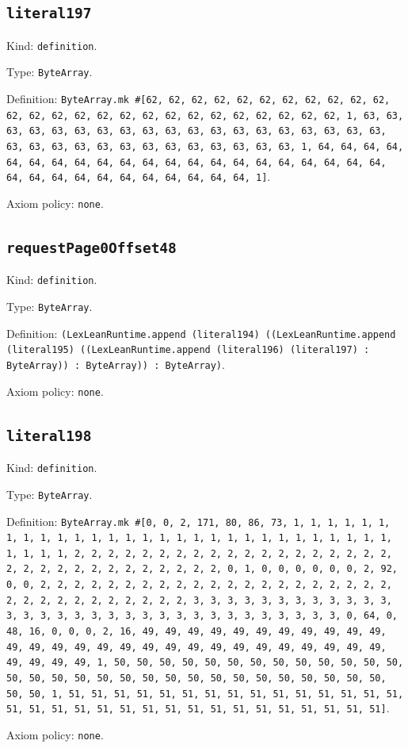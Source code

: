 \documentclass[11pt]{article}
\begin{document}
\subsection*{\texttt{literal197}}
\noindent Kind: \texttt{definition}.\par
\noindent Type: \texttt{ByteArray}.\par
\noindent Definition: \texttt{ByteArray.mk \#[62, 62, 62, 62, 62, 62, 62, 62, 62, 62, 62, 62, 62, 62, 62, 62, 62, 62, 62, 62, 62, 62, 62, 62, 62, 62, 1, 63, 63, 63, 63, 63, 63, 63, 63, 63, 63, 63, 63, 63, 63, 63, 63, 63, 63, 63, 63, 63, 63, 63, 63, 63, 63, 63, 63, 63, 63, 63, 63, 1, 64, 64, 64, 64, 64, 64, 64, 64, 64, 64, 64, 64, 64, 64, 64, 64, 64, 64, 64, 64, 64, 64, 64, 64, 64, 64, 64, 64, 64, 64, 64, 64, 1]}.\par
\noindent Axiom policy: \texttt{none}.\par
\subsection*{\texttt{requestPage0Offset48}}
\noindent Kind: \texttt{definition}.\par
\noindent Type: \texttt{ByteArray}.\par
\noindent Definition: \texttt{(LexLeanRuntime.append (literal194) ((LexLeanRuntime.append (literal195) ((LexLeanRuntime.append (literal196) (literal197) : ByteArray)) : ByteArray)) : ByteArray)}.\par
\noindent Axiom policy: \texttt{none}.\par
\subsection*{\texttt{literal198}}
\noindent Kind: \texttt{definition}.\par
\noindent Type: \texttt{ByteArray}.\par
\noindent Definition: \texttt{ByteArray.mk \#[0, 0, 2, 171, 80, 86, 73, 1, 1, 1, 1, 1, 1, 1, 1, 1, 1, 1, 1, 1, 1, 1, 1, 1, 1, 1, 1, 1, 1, 1, 1, 1, 1, 1, 1, 1, 1, 1, 1, 1, 2, 2, 2, 2, 2, 2, 2, 2, 2, 2, 2, 2, 2, 2, 2, 2, 2, 2, 2, 2, 2, 2, 2, 2, 2, 2, 2, 2, 2, 2, 2, 2, 0, 1, 0, 0, 0, 0, 0, 0, 2, 92, 0, 0, 2, 2, 2, 2, 2, 2, 2, 2, 2, 2, 2, 2, 2, 2, 2, 2, 2, 2, 2, 2, 2, 2, 2, 2, 2, 2, 2, 2, 2, 2, 2, 2, 3, 3, 3, 3, 3, 3, 3, 3, 3, 3, 3, 3, 3, 3, 3, 3, 3, 3, 3, 3, 3, 3, 3, 3, 3, 3, 3, 3, 3, 3, 3, 3, 0, 64, 0, 48, 16, 0, 0, 0, 2, 16, 49, 49, 49, 49, 49, 49, 49, 49, 49, 49, 49, 49, 49, 49, 49, 49, 49, 49, 49, 49, 49, 49, 49, 49, 49, 49, 49, 49, 49, 49, 49, 49, 1, 50, 50, 50, 50, 50, 50, 50, 50, 50, 50, 50, 50, 50, 50, 50, 50, 50, 50, 50, 50, 50, 50, 50, 50, 50, 50, 50, 50, 50, 50, 50, 50, 1, 51, 51, 51, 51, 51, 51, 51, 51, 51, 51, 51, 51, 51, 51, 51, 51, 51, 51, 51, 51, 51, 51, 51, 51, 51, 51, 51, 51, 51, 51, 51, 51]}.\par
\noindent Axiom policy: \texttt{none}.\par
\end{document}
